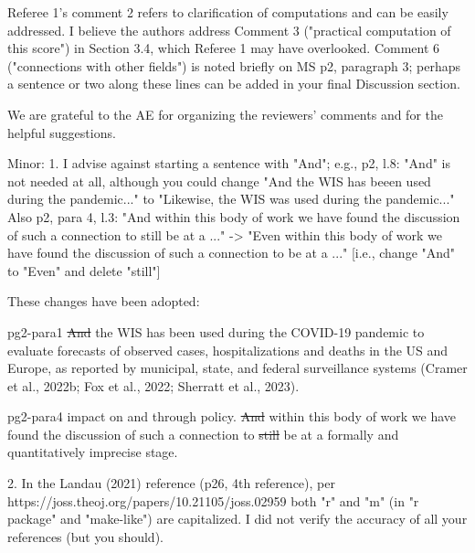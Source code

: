 \documentclass{article}
\providecommand{\DIFaddtex}[1]{{\protect\color{blue}\uwave{#1}}} %
\providecommand{\DIFdeltex}[1]{{\protect\color{red}\sout{#1}}}                      %
\providecommand{\DIFaddbegin}{} %
\providecommand{\DIFaddend}{} %
\providecommand{\DIFdelbegin}{} %
\providecommand{\DIFdelend}{} %
\providecommand{\DIFadd}[1]{\texorpdfstring{\DIFaddtex{#1}}{#1}} %
\providecommand{\DIFdel}[1]{\texorpdfstring{\DIFdeltex{#1}}{}} %
\newcommand{\DIFscaledelfig}{0.5}
\newlength{\DIFdelgraphicswidth} %
\newlength{\DIFdelgraphicsheight} %
\newcommand{\DIFaddincludegraphics}[2][]{{\color{blue}\fbox{\DIFOincludegraphics[#1]{#2}}}} %
\newcommand{\DIFdelincludegraphics}[2][]{%
\sbox{\DIFdelgraphicsbox}{\DIFOincludegraphics[#1]{#2}}%
\settoboxwidth{\DIFdelgraphicswidth}{\DIFdelgraphicsbox} %
\settoboxtotalheight{\DIFdelgraphicsheight}{\DIFdelgraphicsbox} %
\scalebox{\DIFscaledelfig}{%
\parbox[b]{\DIFdelgraphicswidth}{\usebox{\DIFdelgraphicsbox}\\[-\baselineskip] \rule{\DIFdelgraphicswidth}{0em}}\llap{\resizebox{\DIFdelgraphicswidth}{\DIFdelgraphicsheight}{%
\setlength{\unitlength}{\DIFdelgraphicswidth}%
\begin{picture}(1,1)%
\thicklines\linethickness{2pt} %
{\color[rgb]{1,0,0}\put(0,0){\framebox(1,1){}}}%
{\color[rgb]{1,0,0}\put(0,0){\line( 1,1){1}}}%
{\color[rgb]{1,0,0}\put(0,1){\line(1,-1){1}}}%
\end{picture}%
}\hspace*{3pt}}} %
} %
\DeclareRobustCommand{\DIFaddbegin}{\DIFOaddbegin \let\includegraphics\DIFaddincludegraphics} %
\DeclareRobustCommand{\DIFaddend}{\DIFOaddend \let\includegraphics\DIFOincludegraphics} %
\DeclareRobustCommand{\DIFdelbegin}{\DIFOdelbegin \let\includegraphics\DIFdelincludegraphics} %
\DeclareRobustCommand{\DIFdelend}{\DIFOaddend \let\includegraphics\DIFOincludegraphics} %
\begin{document}
\begin{quotebar}
Referee 1's comment 2 refers to clarification of computations and
can be easily addressed.  I believe the authors address Comment 3
("practical computation of this score") in Section 3.4, which Referee 1
may have overlooked.  Comment 6 ("connections with other fields") is
noted briefly on MS p2, paragraph 3; perhaps a sentence or two along
these lines can be added in your final Discussion section.
\end{quotebar}

We are grateful to the AE for organizing the reviewers’ comments and for the helpful suggestions. 

\begin{quotebar}
Minor:
1. I advise against starting a sentence with "And"; e.g., p2, l.8:
"And" is not needed at all, although you could change
  "And the WIS has beeen used during the pandemic..."
to
  "Likewise, the WIS was used during the pandemic..."
Also p2, para 4, l.3:
 "And within this body of work we have found the discussion of such
  a connection to still be at a ..."
->
 "Even within this body of work we have found the discussion of such
  a connection to be at a ..."
  [i.e., change "And" to "Even" and delete "still"]
\end{quotebar}

These changes have been adopted:

\begin{mybox}{pg2-para1}
\DIFdelbegin \DIFdel{And }\DIFdelend \DIFaddbegin \DIFadd{Likewise, }\DIFaddend the WIS has been used during the COVID-19 pandemic to evaluate forecasts
of observed cases, hospitalizations and deaths in the US and Europe, as reported by municipal, state, and federal
surveillance systems (Cramer et al., 2022b; Fox et al., 2022; Sherratt et al., 2023).
\end{mybox}

\begin{mybox}{pg2-para4}
  impact on and through policy.  \DIFdelbegin \DIFdel{And }\DIFdelend \DIFaddbegin \DIFadd{Even }\DIFaddend within this body of work we have found the discussion of such a connection to
  \DIFdelbegin \DIFdel{still
  }\DIFdelend be at a formally and quantitatively imprecise stage. 
\end{mybox}

\begin{quotebar}
2. In the Landau (2021) reference (p26, 4th reference), per \\
https://joss.theoj.org/papers/10.21105/joss.02959
both "r" and "m" (in "r package" and "make-like") are capitalized.
I did not verify the accuracy of all your references (but you should).
\end{quotebar}
\end{document}
